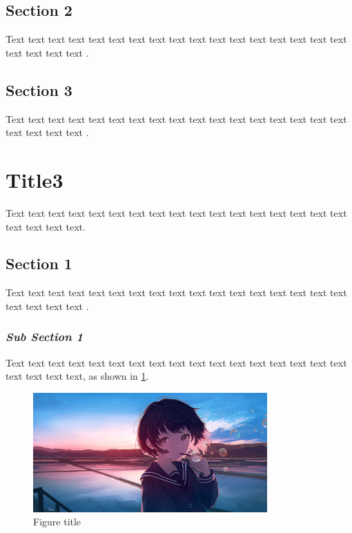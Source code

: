 \documentclass[12pt,a4paper]{article}
\numberwithin{equation}{section}
\begin{document}
{{\subsection{Section 2}
\hspace{2em}Text text text text text text text text text text text text text text text text text text text text text \cite{2}.

\subsection{Section 3}
\hspace{2em}Text text text text text text text text text text text text text text text text text text text text text \cite{3}.


\section{Title3}
\hspace{2em}Text text text text text text text text text text text text text text text text text text text text text.

\subsection{Section 1}
\hspace{2em}Text text text text text text text text text text text text text text text text text text text text text \cite{4}.

\subsubsection{\textit{Sub Section 1}}
\hspace{2em}Text text text text text text text text text text text text text text text text text text text text text, as shown in \cref{fig:3- 1}.
\begin{figure}[h]
    \centering
    \includegraphics[width=0.8\textwidth, height=0.8\textwidth]{Fig example.png}
    \caption{Figure title}
    \label{fig:3- 1}
\end{figure}

}}
\end{document}

